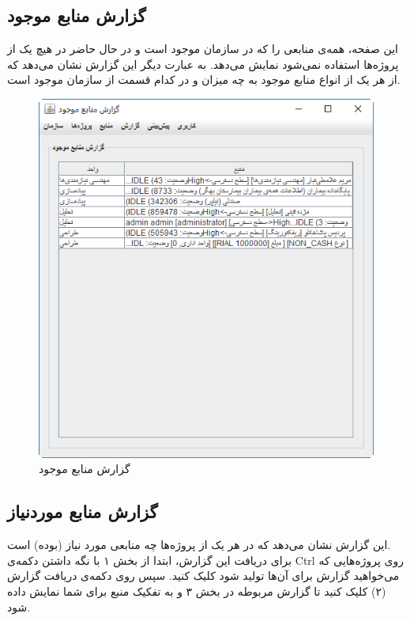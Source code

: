 \subsection{گزارش منابع موجود}
 این صفحه، همه‌ی منابعی را که در سازمان موجود است و در حال حاضر در هیچ یک از پروژه‌ها استفاده نمی‌شود نمایش می‌دهد. به عبارت دیگر این گزارش نشان می‌دهد که از هر یک از انواع منابع موجود به چه میزان و در کدام قسمت از سازمان موجود است.
	\begin{figure}[H]
		\centering
		\includegraphics[scale=0.7]{img/manual/availRep}
		\caption{گزارش منابع موجود}
	\end{figure}


\subsection{گزارش منابع موردنیاز}
این گزارش نشان می‌دهد که در هر یک از پروژه‌ها چه منابعی مورد نیاز  (بوده) است.\\
برای دریافت این گزارش، ابتدا از بخش ۱ با نگه داشتن دکمه‌ی Ctrl روی پروژه‌هایی که می‌خواهید گزارش برای آن‌ها تولید شود کلیک کنید. سپس روی دکمه‌ی دریافت گزارش (۲) کلیک کنید تا گزارش مربوطه در بخش ۳ و به تفکیک منبع برای شما نمایش داده شود.

